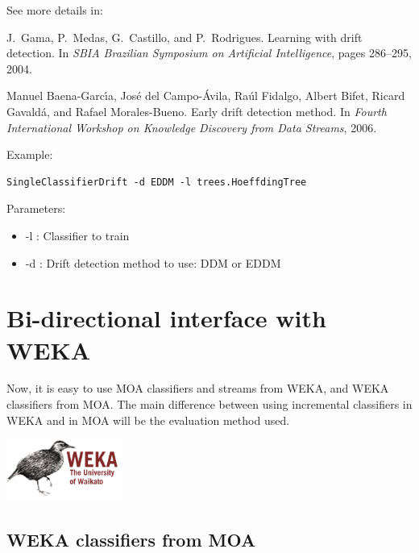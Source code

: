 \documentclass[a4paper,12pt,twoside]{book}
\begin{document}
See more details in:

\begin{itemize}
J.~Gama, P.~Medas, G.~Castillo, and P.~Rodrigues.
\newblock Learning with drift detection.
\newblock In {\em SBIA Brazilian Symposium on Artificial Intelligence}, pages
  286--295, 2004.

Manuel Baena-Garc\'{\i}a, Jos{\'e} del Campo-{\'A}vila, Ra\'ul Fidalgo, Albert
  Bifet, Ricard Gavald\'a, and Rafael Morales-Bueno.
\newblock Early drift detection method.
\newblock In {\em Fourth International Workshop on Knowledge Discovery from
  Data Streams}, 2006.\end{itemize}

Example:
\begin{footnotesize}\begin{verbatim}
SingleClassifierDrift -d EDDM -l trees.HoeffdingTree
\end{verbatim}\end{footnotesize}

Parameters:
\begin{itemize}
\item -l : Classifier to train
\item -d : Drift detection method to use: DDM or EDDM
\end{itemize}



\chapter{Bi-directional interface with WEKA}
\label{chap:Weka}

Now, it is easy to use MOA classifiers and streams from WEKA, and WEKA classifiers from MOA.
The main difference between using incremental classifiers in WEKA and in MOA will be the evaluation method used.

\begin{center}
\includegraphics[height=2cm]{images/Weka.png}\end{center}

\section{WEKA classifiers from MOA}
\end{document}
